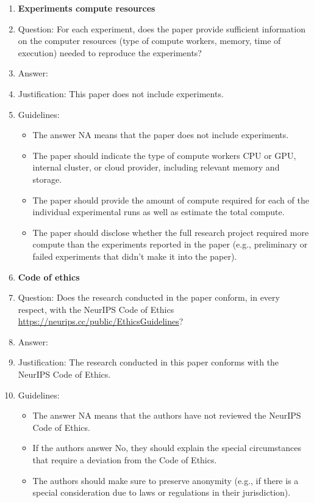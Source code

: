 \documentclass{article}
\begin{document}
\begin{enumerate}
\item {\bf Experiments compute resources}
    \item[] Question: For each experiment, does the paper provide sufficient information on the computer resources (type of compute workers, memory, time of execution) needed to reproduce the experiments?
    \item[] Answer: \answerNA{} %
    \item[] Justification: This paper does not include experiments.
    \item[] Guidelines:
    \begin{itemize}
        \item The answer NA means that the paper does not include experiments.
        \item The paper should indicate the type of compute workers CPU or GPU, internal cluster, or cloud provider, including relevant memory and storage.
        \item The paper should provide the amount of compute required for each of the individual experimental runs as well as estimate the total compute. 
        \item The paper should disclose whether the full research project required more compute than the experiments reported in the paper (e.g., preliminary or failed experiments that didn't make it into the paper). 
    \end{itemize}
    
\item {\bf Code of ethics}
    \item[] Question: Does the research conducted in the paper conform, in every respect, with the NeurIPS Code of Ethics \url{https://neurips.cc/public/EthicsGuidelines}?
    \item[] Answer: \answerYes{} %
    \item[] Justification: The research conducted in this paper conforms with the NeurIPS Code of Ethics.
    \item[] Guidelines:
    \begin{itemize}
        \item The answer NA means that the authors have not reviewed the NeurIPS Code of Ethics.
        \item If the authors answer No, they should explain the special circumstances that require a deviation from the Code of Ethics.
        \item The authors should make sure to preserve anonymity (e.g., if there is a special consideration due to laws or regulations in their jurisdiction).
    \end{itemize}



\end{enumerate}
\end{document}
